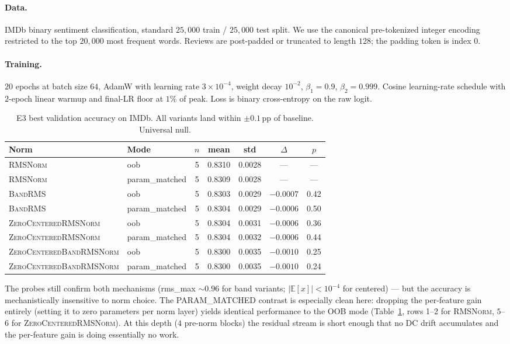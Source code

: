 \documentclass{article}
\newcommand{\E}{\mathbb{E}}
\newcommand{\rms}{\textsc{RMSNorm}}
\newcommand{\bandrms}{\textsc{BandRMS}}
\newcommand{\zcrms}{\textsc{ZeroCentered}\-\textsc{RMSNorm}}
\newcommand{\zcband}{\textsc{ZeroCentered}\-\textsc{BandRMSNorm}}
\begin{document}
\paragraph{Data.}
IMDb binary sentiment classification, standard $25{,}000$ train / $25{,}000$ test split.
We use the canonical pre-tokenized integer encoding restricted to the top $20{,}000$ most frequent words.
Reviews are post-padded or truncated to length $128$; the padding token is index $0$.

\paragraph{Training.}
$20$ epochs at batch size $64$, AdamW with learning rate $3 \times 10^{-4}$, weight decay $10^{-2}$, $\beta_1 = 0.9$, $\beta_2 = 0.999$.
Cosine learning-rate schedule with $2$-epoch linear warmup and final-LR floor at $1\%$ of peak.
Loss is binary cross-entropy on the raw logit.

\begin{table}[H]
\centering
\caption{E3 best validation accuracy on IMDb. All variants land within $\pm 0.1$\,pp of baseline. Universal null.}
\label{tab:e3}
\renewcommand{\arraystretch}{1.15}
\begin{tabular}{llccccc}
\toprule
\textbf{Norm} & \textbf{Mode} & \textbf{$n$} & \textbf{mean} & \textbf{std} & \textbf{$\Delta$} & \textbf{$p$} \\
\midrule
\rms{}            & oob            & 5 & 0.8310 & 0.0028 & --- & --- \\
\rms{}            & param\_matched & 5 & 0.8309 & 0.0028 & --- & --- \\
\bandrms{}        & oob            & 5 & 0.8303 & 0.0029 & $-0.0007$ & 0.42 \\
\bandrms{}        & param\_matched & 5 & 0.8304 & 0.0029 & $-0.0006$ & 0.50 \\
\zcrms{}          & oob            & 5 & 0.8304 & 0.0031 & $-0.0006$ & 0.36 \\
\zcrms{}          & param\_matched & 5 & 0.8304 & 0.0032 & $-0.0006$ & 0.44 \\
\zcband{}         & oob            & 5 & 0.8300 & 0.0035 & $-0.0010$ & 0.25 \\
\zcband{}         & param\_matched & 5 & 0.8300 & 0.0035 & $-0.0010$ & 0.24 \\
\bottomrule
\end{tabular}
\end{table}

The probes still confirm both mechanisms (rms\_max $\sim 0.96$ for band variants; $|\E[x]| < 10^{-4}$ for centered) --- but the accuracy is mechanistically insensitive to norm choice.
The PARAM\_MATCHED contrast is especially clean here: dropping the per-feature gain entirely (setting it to zero parameters per norm layer) yields identical performance to the OOB mode (Table~\ref{tab:e3}, rows 1--2 for \rms{}, $5$--$6$ for \zcrms{}).
At this depth ($4$ pre-norm blocks) the residual stream is short enough that no DC drift accumulates and the per-feature gain is doing essentially no work.
\end{document}
